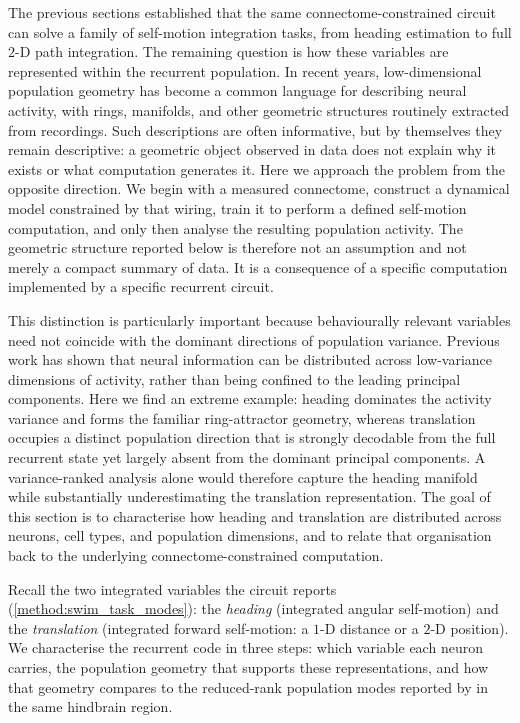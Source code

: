 \documentclass[11pt]{article}
\begin{document}
The previous sections established that the same connectome-constrained circuit
can solve a family of self-motion integration tasks, from heading estimation to
full $2$-D path integration. The remaining question is how these variables are
represented within the recurrent population. In recent years, low-dimensional
population geometry has become a common language for describing neural activity,
with rings, manifolds, and other geometric structures routinely extracted from
recordings. Such descriptions are often informative, but by themselves they
remain descriptive: a geometric object observed in data does not explain why it
exists or what computation generates it. Here we approach the problem from the
opposite direction. We begin with a measured connectome, construct a dynamical
model constrained by that wiring, train it to perform a defined self-motion
computation, and only then analyse the resulting population activity. The
geometric structure reported below is therefore not an assumption and not merely
a compact summary of data. It is a consequence of a specific computation
implemented by a specific recurrent circuit.

This distinction is particularly important because behaviourally relevant
variables need not coincide with the dominant directions of population variance.
Previous work has shown that neural information can be distributed across
low-variance dimensions of activity, rather than being confined to the leading
principal components. Here we find an extreme example: heading dominates the
activity variance and forms the familiar ring-attractor geometry, whereas
translation occupies a distinct population direction that is strongly decodable
from the full recurrent state yet largely absent from the dominant principal
components. A variance-ranked analysis alone would therefore capture the heading
manifold while substantially underestimating the translation representation. The
goal of this section is to characterise how heading and translation are
distributed across neurons, cell types, and population dimensions, and to relate
that organisation back to the underlying connectome-constrained computation.

Recall the two integrated variables the circuit reports
(\cref{method:swim_task_modes}): the \emph{heading} (integrated angular
self-motion) and the \emph{translation} (integrated forward self-motion: a
$1$-D distance or a $2$-D position). We characterise the recurrent code in three
steps: which variable each neuron carries, the population geometry that supports
these representations, and how that geometry compares to the reduced-rank
population modes reported by \citet{feierstein2023} in the same hindbrain
region.
\end{document}
